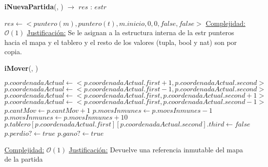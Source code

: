 \documentclass[10pt,a4paper]{article}
\begin{document}
\begin{Algoritmos}
    
    \begin{algorithm}{\textbf{iNuevaPartida}(, ) $\to$ $res$ : $estr$}
        \begin{algorithmic}
            \State $res \gets <puntero(m), puntero(t), m.inicio, 0, 0, false, false>$
            \Statex \underline{Complejidad:} $\mathcal{O}(1)$
            \Statex \underline{Justificación:} Se le asignan a la estructura interna de la estr punteros hacia el mapa y el tablero y el resto de los valores (tupla, bool y nat) son por copia.
        \end{algorithmic}
    \end{algorithm}
    
    \begin{algorithm}{\textbf{iMover}(, )}
        \begin{algorithmic}
                    \State $p.coordenadaActual \gets <p.coordenadaActual.first + 1, p.coordenadaActual.second>$
                \Else
                        \State $p.coordenadaActual \gets <p.coordenadaActual.first - 1, p.coordenadaActual.second>$
                    \Else
                            \State $p.coordenadaActual \gets <p.coordenadaActual.first, p.coordenadaActual.second + 1>$
                        \Else
                            \State $p.coordenadaActual \gets <p.coordenadaActual.first, p.coordenadaActual.second - 1>$
            \EndIf
            \State $p.cantMov \gets p.cantMov + 1$
                \State $p.movsInmunes \gets p.movsInmunes - 1$
            \EndIf
                \State $p.movsInmunes \gets p.movsInmunes + 10$
                \State $p.tablero[p.coordenadaActual.first][p.coordenadaActual.second].third \gets false$
            \EndIf
                \State $p.perdio? \gets true$
            \Else
                    \State $p.gano? \gets true$
            \EndIf
            
            \Statex \underline{Complejidad:} $\mathcal{O}(1)$
            \Statex \underline{Justificación:} Devuelve una referencia inmutable del mapa de la partida
        \end{algorithmic}
    \end{algorithm}
    

\end{Algoritmos}
\end{document}
